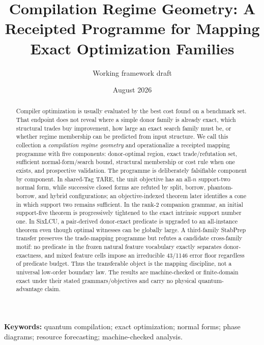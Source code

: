 \documentclass[11pt]{article}
\title{Compilation Regime Geometry: A Receipted Programme for Mapping Exact Optimization Families}
\author{Working framework draft}
\date{August 2026}
\begin{document}
\maketitle
\begin{abstract}
Compiler optimization is usually evaluated by the best cost found on a benchmark set. That endpoint does not reveal where a simple donor family is already exact, which structural trades buy improvement, how large an exact search family must be, or whether regime membership can be predicted from input structure. We call this collection a \emph{compilation regime geometry} and operationalize a receipted mapping programme with five components: donor-optimal region, exact trade/refutation set, sufficient normal-form/search bound, structural membership or cost rule when one exists, and prospective validation. The programme is deliberately falsifiable component by component. In shared-Tag TARE, the unit objective has an all-$n$ support-two normal form, while successive closed forms are refuted by split, borrow, phantom-borrow, and hybrid configurations; an objective-indexed theorem later identifies a cone in which support two remains sufficient. In the rank-2 companion grammar, an initial support-five theorem is progressively tightened to the exact intrinsic support number one. In SixLCU, a pair-derived donor-exact predicate is upgraded to an all-instance theorem even though optimal witnesses can be globally large. A third-family StabPrep transfer preserves the trade-mapping programme but refutes a candidate cross-family motif: no predicate in the frozen natural feature vocabulary exactly separates donor-exactness, and mixed feature cells impose an irreducible 43/1146 error floor regardless of predicate budget. Thus the transferable object is the mapping discipline, not a universal low-order boundary law. The results are machine-checked or finite-domain exact under their stated grammars/objectives and carry no physical quantum-advantage claim.
\end{abstract}

\noindent\textbf{Keywords:} quantum compilation; exact optimization; normal forms; phase diagrams; resource forecasting; machine-checked analysis.










\end{document}
